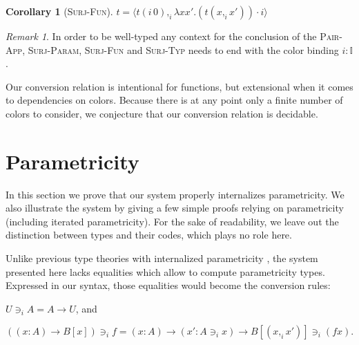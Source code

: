 \documentclass[english]{PaperTools/latex/entcs}
\theoremstyle{plain}
\newtheorem{corollary}[theorem]{Corollary}
\theoremstyle{definition}
\theoremstyle{remark}
\newtheorem*{remark}{Remark}
\newcommand\CP[3]{(#2,_{#1} #3)}
\newcommand\CTimes[2]{(#2) ×_{#1}}
\newcommand\param[1]{\!\cdot\!#1}
\newcommand\op[1]{∋_{#1}}
\newcommand\fp[3]{⟨#2 ,_{#1} #3⟩}
\newcommand\mor[2]{({#1}\,{#2})}
\newcommand\proj[2]{{#2}\mor{#1}0}
\begin{document}
\begin{corollary}[\textsc{Surj-Fun}]
  \label{cor:surj-fun}
  $t = \fp i {\proj i t} {λx x'. (t \CP i x {x'}) \param i}$
\end{corollary}

\begin{remark}
  In order to be well-typed any context for the conclusion of the
  \textsc{Pair-App}, \textsc{Surj-Param}, \textsc{Surj-Fun} and
  \textsc{Surj-Typ} needs to end with the color binding $i : 𝕀$.
\end{remark}


Our conversion relation is intentional for functions, but extensional
when it comes to dependencies on colors. Because there is at any point
only a finite number of colors to consider, we conjecture that our
conversion relation is decidable.

\section{Parametricity}
\label{sec:parametricity}
In this section we prove that our system properly internalizes
parametricity. We also illustrate the system by giving a few simple
proofs relying on parametricity (including iterated parametricity).
For the sake of readability, we leave out the distinction between types
and their codes, which plays no role here.

Unlike previous type theories with internalized parametricity
\citep{bernardy_computational_2012, bernardy_type-theory_2013}, the
system presented here lacks equalities which allow to compute
parametricity types. Expressed in our syntax, those equalities would
become the conversion rules:
\begin{center}$U \op i A = A → U$, and\end{center}
\begin{center}$((x:A) → B[x]) \op i f = (x:A) → (x' : A \op i x) → B[\CP i x {x'}] \op i (f x).$\end{center}
\end{document}
